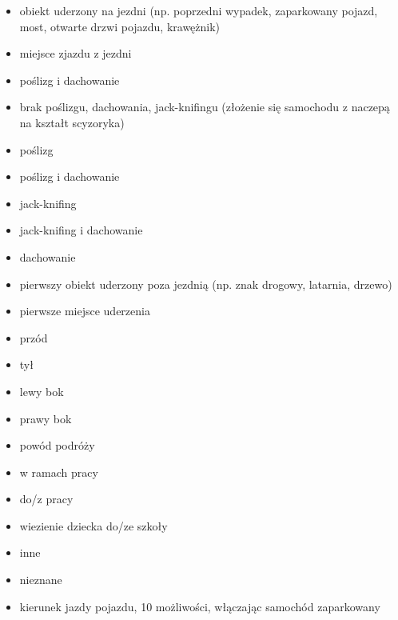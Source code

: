 \begin{itemize}
\item
  obiekt uderzony na jezdni (np. poprzedni wypadek, zaparkowany pojazd,
  most, otwarte drzwi pojazdu, krawężnik)\\
\item
  miejsce zjazdu z jezdni\\
\item
  poślizg i dachowanie\\
\item
  brak poślizgu, dachowania, jack-knifingu (złożenie się samochodu z
  naczepą na kształt scyzoryka)\\
\item
  poślizg\\
\item
  poślizg i dachowanie\\
\item
  jack-knifing\\
\item
  jack-knifing i dachowanie\\
\item
  dachowanie\\
\item
  pierwszy obiekt uderzony poza jezdnią (np. znak drogowy, latarnia,
  drzewo)\\
\item
  pierwsze miejsce uderzenia\\
\item
  przód\\
\item
  tył\\
\item
  lewy bok\\
\item
  prawy bok\\
\item
  powód podróży\\
\item
  w ramach pracy\\
\item
  do/z pracy\\
\item
  wiezienie dziecka do/ze szkoły\\
\item
  inne\\
\item
  nieznane\\
\item
  kierunek jazdy pojazdu, 10 możliwości, włączając samochód zaparkowany
\end{itemize}

